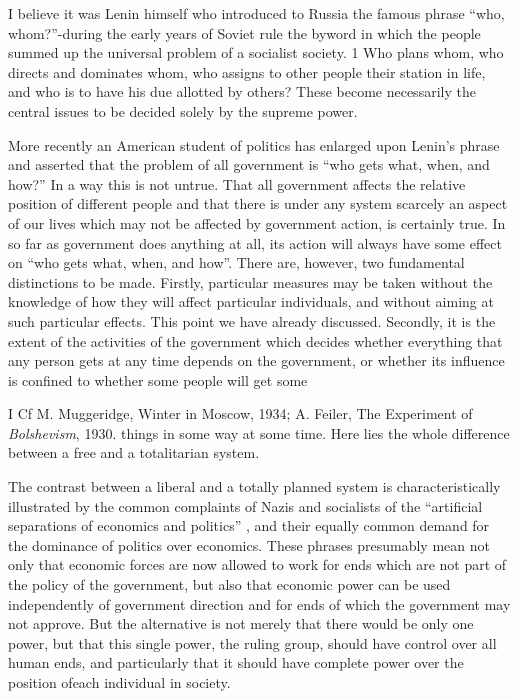 \documentclass[11pt,openany]{book}
\begin{document}
I believe it was Lenin himself who introduced to Russia the famous phrase ``who, whom?''-during the early years of Soviet rule the byword in which the people summed up the universal problem of a socialist society. 1 Who plans whom, who directs and dominates whom, who assigns to other people their station in life, and who is to have his due allotted by others? These become necessarily the central issues to be decided solely by the supreme power.

More recently an American student of politics has enlarged upon Lenin's phrase and asserted that the problem of all government is ``who gets what, when, and how?'' In a way this is not untrue. That all government affects the relative position of different people and that there is under any system scarcely an aspect of our lives which may not be affected by government action, is certainly true. In so far as government does anything at all, its action will always have some effect on ``who gets what, when, and how''. There are, however, two fundamental distinctions to be made. Firstly, particular measures may be taken without the knowledge of how they will affect particular individuals, and without aiming at such particular effects. This point we have already discussed. Secondly, it is the extent of the activities of the government which decides whether everything that any person gets at any time depends on the government, or whether its influence is confined to whether some people will get some

I Cf M. Muggeridge, Winter in Moscow, 1934; A. Feiler, The Experiment of \emph{Bolshevism}, 1930. things in some way at some time. Here lies the whole difference between a free and a totalitarian system.

The contrast between a liberal and a totally planned system is characteristically illustrated by the common complaints of Nazis and socialists of the ``artificial separations of economics and politics'' , and their equally common demand for the dominance of politics over economics. These phrases presumably mean not only that economic forces are now allowed to work for ends which are not part of the policy of the government, but also that economic power can be used independently of government direction and for ends of which the government may not approve. But the alternative is not merely that there would be only one power, but that this single power, the ruling group, should have control over all human ends, and particularly that it should have complete power over the position ofeach individual in society.
\end{document}

